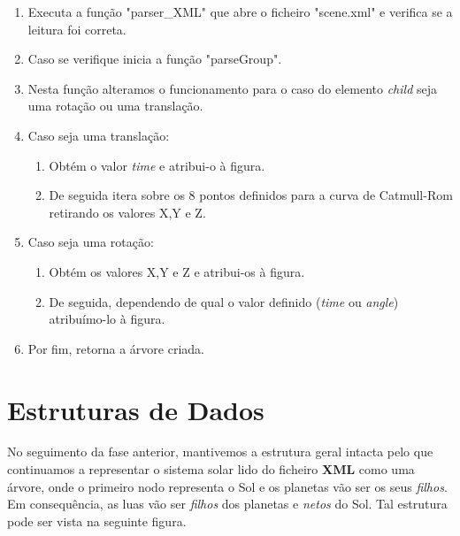\documentclass[a4paper]{article}
\begin{document}
\ttfamily
\begin{enumerate}
  \item Executa a função "parser\_XML" que abre o ficheiro "scene.xml" e verifica se a leitura foi correta.
  \item Caso se verifique inicia a função "parseGroup".
  \item Nesta função alteramos o funcionamento para o caso do elemento \textit{child} seja uma rotação ou uma translação.
  \item Caso seja uma translação:
  \begin{enumerate}
    \item Obtém o valor \textit{time} e atribui-o à figura.
    \item De seguida itera sobre os 8 pontos definidos para a curva de Catmull-Rom retirando os valores X,Y e Z.
  \end{enumerate}
  \item Caso seja uma rotação:
  \begin{enumerate}
    \item Obtém os valores X,Y e Z e atribui-os à figura.
    \item De seguida, dependendo de qual o valor definido (\textit{time} ou \textit{angle}) atribuímo-lo à figura.
  \end{enumerate}
  \item Por fim, retorna a árvore criada.
\end{enumerate}
\rmfamily


\section{Estruturas de Dados}
\label{sec:estruturasdados}

No seguimento da fase anterior, mantivemos a estrutura geral intacta pelo que continuamos a representar o sistema solar lido do ficheiro \textbf{XML} como uma árvore, onde o primeiro nodo representa o Sol e os planetas vão ser os seus \textit{filhos}. Em consequência, as luas vão ser \textit{filhos} dos planetas e \textit{netos} do Sol. Tal estrutura pode ser vista na seguinte figura.
\end{document}
